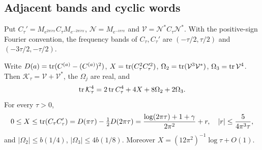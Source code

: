 \subsection{Adjacent bands and cyclic words}\label{app:adjacent}
Put $C_\tau'=M_{e^{2\pi i\tau x}}C_\tau M_{e^{-2\pi i\tau x}}$,
$\mathcal N=M_{e^{-i\pi\tau x}}$ and $\mathcal V=\mathcal N^*C_\tau\mathcal N^*$.
With the positive-sign Fourier convention, the frequency bands of
$C_\tau,C_\tau'$ are $(-\tau/2,\tau/2)$ and $(-3\tau/2,-\tau/2)$.

\begin{proposition}\label{short:cor:adjacent-quadratic}
\label{T4:lem:factor}\label{rev5:prop:phase}\label{T4:conj:twoband}
Write $D(a)=\operatorname{tr}(C^{(a)}-(C^{(a)})^2)$,
$X=\operatorname{tr}(C_\tau^2C_\tau'^2)$,
$\Omega_2=\operatorname{tr}(\mathcal V^3\mathcal V^*)$, $\Omega_3=\operatorname{tr}\mathcal V^4$.
Then $\mathcal K_\tau=\mathcal V+\mathcal V^*$, the $\Omega_j$ are real, and
\begin{equation}\label{short:eq:cyclic}
\operatorname{tr}\mathcal K_\tau^4=2\operatorname{tr} C_\tau^4+4X+8\Omega_2+2\Omega_3.
\end{equation}
For every $\tau>0$,
\[
0\le X\le\operatorname{tr}(C_\tau C_\tau')=D(\pi\tau)-\tfrac12D(2\pi\tau)
=\frac{\log(2\pi\tau)+1+\gamma}{2\pi^2}+r,\quad
|r|\le\frac5{4\pi^3\tau},
\]
and $|\Omega_2|\le b(1/4)$, $|\Omega_3|\le4b(1/8)$.
Moreover $X=(12\pi^2)^{-1}\log\tau+O(1)$.
\end{proposition}
